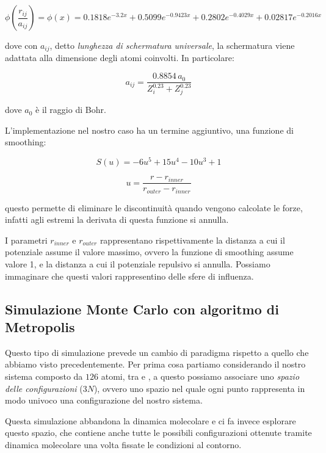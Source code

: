 \begin{equation}
    \phi\left(\frac{r_{ij}}{a_{ij}}\right) = \phi(x) = 0.1818e^{-3.2x} + 0.5099e^{-0.9423x} + 0.2802e^{-0.4029x} + 0.02817e^{-0.2016x}
\end{equation}

dove con $a_{ij}$, detto \textit{lunghezza di schermatura universale}, la schermatura viene adattata alla dimensione degli atomi coinvolti. In particolare:

\begin{equation}
    a_{ij} = \frac{0.8854\, a_0}{Z_i^{0.23} + Z_j^{0.23}}
\end{equation}

dove $a_0$ è il raggio di Bohr.

L'implementazione nel nostro caso ha un termine aggiuntivo, una funzione di smoothing: 

\begin{equation}
    S(u) = -6u^5 + 15u^4 - 10u^3 +1
\end{equation}

\begin{equation}
    u = \frac{r-r_{inner}}{r_{outer}-r_{inner}}
\end{equation}

questo permette di eliminare le discontinuità quando vengono calcolate le forze, infatti agli estremi la derivata di questa funzione si annulla.

I parametri $r_{inner}$ e $r_{outer}$ rappresentano rispettivamente la distanza a cui il potenziale assume il valore massimo, ovvero la funzione di smoothing assume valore 1, e la distanza a cui il potenziale repulsivo si annulla. Possiamo immaginare che questi valori rappresentino delle sfere di influenza.

\subsection{Simulazione Monte Carlo con algoritmo di Metropolis}
\label{subsec:simulazione-metropolis-teoria}

Questo tipo di simulazione prevede un cambio di paradigma rispetto a quello che abbiamo visto precedentemente.
Per prima cosa partiamo considerando il nostro sistema composto da $126$ atomi, tra  e , a questo possiamo associare uno \textit{spazio delle configurazioni} ($3N$), ovvero uno spazio nel quale ogni punto rappresenta in modo univoco una configurazione del nostro sistema. 

Questa simulazione abbandona la dinamica molecolare e ci fa invece esplorare questo spazio, che contiene anche tutte le possibili configurazioni ottenute tramite dinamica molecolare una volta fissate le condizioni al contorno.

